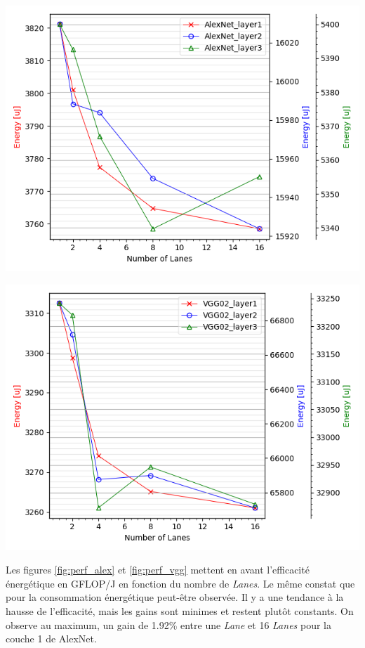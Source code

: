 \documentclass[10pt,letterpaper]{article}
\begin{document}
\begin{multicols}{2}
    {\centering
    \includegraphics[width=\linewidth]{Alex_energy.png}
    \captionsetup{hypcap=false}
    \label{fig:energy_alex}}
    \bigskip

    {\centering
    \includegraphics[width=\linewidth]{VGG_energy.png}
    \captionsetup{hypcap=false}
    \label{fig:energy_vgg}}
    \bigskip

    Les figures \ref{fig:perf_alex} et \ref{fig:perf_vgg} mettent en avant l'efficacité énergétique en GFLOP/J en fonction du 
    nombre de \textit{Lanes}. Le même constat que pour la consommation énergétique peut-être observée. Il y a une tendance à la
    hausse de l'efficacité, mais les gains sont minimes et restent plutôt constants. On observe au maximum, un gain de 1.92\% entre une
    \textit{Lane} et 16 \textit{Lanes} pour la couche 1 de AlexNet.


\end{multicols}
\end{document}
